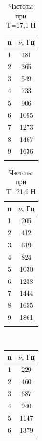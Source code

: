 \documentclass[a4paper, 12pt]{article}%
\begin{document}
\begin{enumerate}
     
     	\begin{minipage}{0.4\textwidth}
     	\begin{longtable}{|c|c|}
     		\hline 
     		n & $\nu$, Гц \\
     		\hline
     		1 & 181\\
     		\hline
     		2 & 365\\
     		\hline
     		3 & 549\\
     		\hline
     		4 & 733\\
     		\hline
     		5 & 906\\
     		\hline
     		6 & 1095\\
     		\hline
     		7 & 1273\\
     		\hline
     		8 & 1467\\
     		\hline
     		9 & 1636\\
     		\hline
     		\caption{Частоты при  T=17,1 Н}
     	\end{longtable}
     \end{minipage} 
 	\begin{minipage}{0.4\textwidth}
 	\begin{longtable}{|c|c|}
 		\hline 
 		n & $\nu$, Гц \\
 		\hline
 		1 & 205\\
 		\hline
 		2 & 412\\
 		\hline
 		3 & 619\\
 		\hline
 		4 & 824\\
 		\hline
 		5 & 1030\\
 		\hline
 		6 & 1238\\
 		\hline
 		7 & 1444\\
 		\hline
 		8 & 1655\\
 		\hline
 		9 & 1861\\
 		\hline
 		\caption{Частоты при T=21,9 Н}
 	\end{longtable}
 \end{minipage}
\\
	\begin{minipage}{0.4\textwidth}
	\begin{longtable}{|c|c|}
		\hline 
		n & $\nu$, Гц \\
		\hline
		1 & 229\\
		\hline
		2 & 460\\
		\hline
		3 & 687\\
		\hline
		4 & 940\\
		\hline
		5 & 1147\\
		\hline
		6 & 1379\\

\end{longtable}
\end{minipage}
\end{enumerate}
\end{document}
